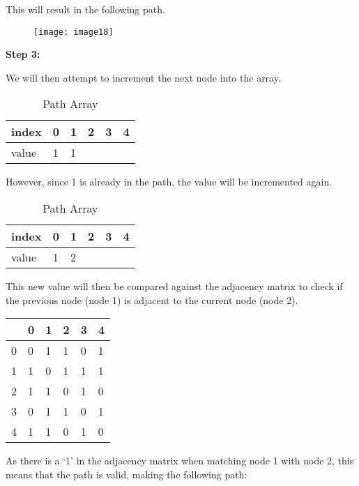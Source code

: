 This will result in the following path.

\begin{figure}[H]
    \centering
    \texttt{[image: image18]}
\end{figure}

\textbf{Step 3:}

We will then attempt to increment the next node into the array.

\begin{table}[H]
    \centering
    \caption{Path Array}
    \begin{tabular}{l | lllll}
        index & 0 & 1 & 2 & 3 & 4  \\
        \hline
        value & 1 & {\cellcolor[rgb]{0.933,0.804,0.804}}1 &   &   &    \\
    \end{tabular}
\end{table}

However, since 1 is already in the path, the value will be incremented again.

\begin{table}[H]
    \centering
    \caption{Path Array}
    \begin{tabular}{l | lllll}
        index & 0 & 1 & 2 & 3 & 4  \\
        \hline
        value & 1 & 2 &   &   &    \\
    \end{tabular}
\end{table}

This new value will then be compared against the adjacency matrix to check if
the previous node (node 1) is adjacent to the current node (node 2).

\begin{table}[H]
    \centering
    \begin{tabular}{l | lllll}
          & 0 & 1 & 2 & 3 & 4  \\
        \hline
        0 & 0 & {\cellcolor[rgb]{0.863,0.914,0.835}}1 & 1 & 0 & 1  \\
        1 & 1 & 0 & 1 & 1 & 1  \\
        2 & 1 & 1 & 0 & 1 & 0  \\
        3 & 0 & 1 & 1 & 0 & 1  \\
        4 & 1 & 1 & 0 & 1 & 0 
    \end{tabular}
\end{table}

As there is a ‘1’ in the adjacency matrix when matching node 1 with node 2, this
means that the path is valid, making the following path:

